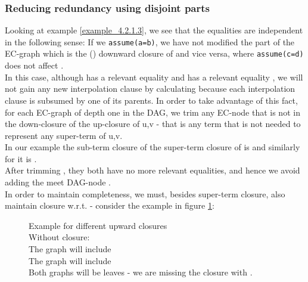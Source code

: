 \subsubsection*{Reducing redundancy using disjoint parts}
Looking at example \ref{example_4.2.1.3}, we see that the equalities  are independent in the following sense:
If we \lstinline|assume(a=b)|, we have not modified the part of the EC-graph which is the (\GFA{}) downward closure of \m{[e_3],[e_4]} and vice versa, where \lstinline|assume(c=d)| does not affect \m{[e_1],[e_2]}.\\
In this case, although  has a relevant equality  and  has a relevant equality , we will not gain any new interpolation clause by calculating  because each interpolation clause is subsumed by one of its parents.
In order to take advantage of this fact, for each EC-graph  of depth one in the DAG, we trim any EC-node that is not in the down-closure of the up-closure of u,v - that is any term that is not needed to represent any super-term of u,v.\\
In our example the sub-term closure of the super-term closure of \s{[a],[b]} is \s{[a],[b],[e_1],[e_2],[\textcolor{red}{x}]} 
and similarly for \s{[c],[d]} it is \s{[c],[d],[e_3],[e_4],[\textcolor{red}{x}]}.\\
After trimming , they both have no more relevant equalities, and hence we avoid adding the meet DAG-node .\\
In order to maintain completeness, we must, besides super-term closure, also maintain closure w.r.t. \eqg - consider the example in figure \ref{example_4.2.1.6}:
\begin{figure}[H]
\caption{Example for different upward closures\\
Without \eqg closure:\\
The graph  will include \s{[a],[b],[c],[\textcolor{red}{x}],[\textcolor{red}{y_0},\textcolor{red}{y_1}]}\\
The graph  will include \s{[b],[c],[d],[\textcolor{red}{x}],[\textcolor{red}{y_1},\textcolor{red}{y_2}]}\\
Both graphs will be leaves - we are missing the closure with \m{\textcolor{red}{y_0} \eqg \textcolor{red}{y_2}}.
}
\label{example_4.2.1.6}
\end{figure}


